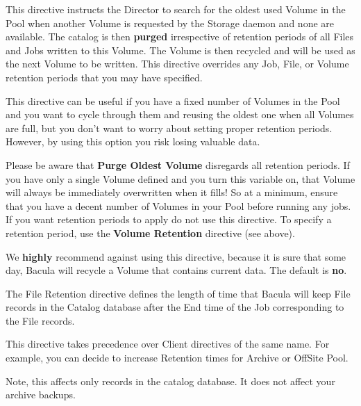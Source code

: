 \begin{description}
\label{PurgeOldest}

\item [Purge Oldest Volume = \lt{}yes\vb{}no\gt{}]
   This directive instructs the Director to search for the oldest used
   Volume in the Pool when another Volume is requested by the Storage
   daemon and none are available.  The catalog is then {\bf purged}
   irrespective of retention periods of all Files and Jobs written to this
   Volume.  The Volume is then recycled and will be used as the next Volume
   to be written.  This directive overrides any Job, File, or Volume
   retention periods that you may have specified.

   This directive can be useful if you have a fixed number of Volumes in
   the Pool and you want to cycle through them and reusing the oldest one
   when all Volumes are full, but you don't want to worry about setting
   proper retention periods.  However, by using this option you risk losing
   valuable data.

   Please be aware that {\bf Purge Oldest Volume} disregards all retention
   periods. If you have only a single Volume defined and you turn this
   variable on, that Volume will always be immediately overwritten when it
   fills!  So at a minimum, ensure that you have a decent number of Volumes
   in your Pool before running any jobs.  If you want retention periods to
   apply do not use this directive.  To specify a retention period, use the
   {\bf Volume Retention} directive (see above).

   We {\bf highly} recommend against using this directive, because it is
   sure that some day, Bacula will recycle a Volume that contains current
   data.  The default is {\bf no}.

\item [File Retention = \lt{}time-period-specification\gt{}]
   The File Retention directive defines the length of time that  Bacula will
   keep File records in the Catalog database after the End time of the
   Job corresponding to the File records. 

   This directive takes precedence over Client directives of the same name. For
   example, you can decide to increase Retention times for Archive or OffSite
   Pool.

   Note, this affects only records in the catalog database. It does not affect
   your archive backups.


\end{description}
